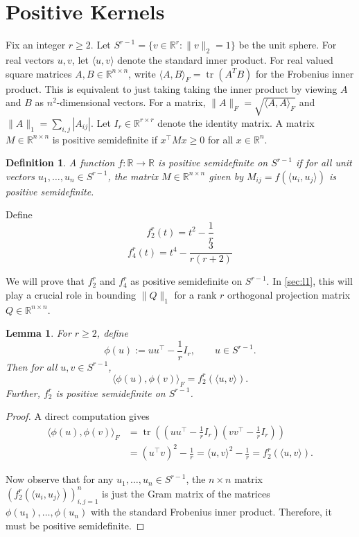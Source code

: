 \documentclass[12pt]{amsart}
\newtheorem{lemma}[lemma]{Lemma}
\theoremstyle{myremark}
\newtheorem{definition}[definition]{Definition}
\DeclareMathOperator{\tr}{tr}
\newcommand{\R}{\mathbb{R}}
\newcommand{\1}{\mathbf{1}}
\newcommand{\inner}[2]{\langle #1,#2\rangle}
\newcommand{\froinner}[2]{\langle #1,#2\rangle_{\!F}}
\begin{document}
\section{Positive Kernels}

Fix an integer $r\ge 2$. Let $S^{r-1} = \{v \in \R^r: \|v\|_2 = 1\}$ be the unit sphere. For real vectors $u,v$, let $\inner{u}{v}$ denote the standard inner product. For real valued square matrices $A,B \in \R^{n\times n}$, write $\inner{A}{B}_F = \tr(A^T B)$ for the Frobenius inner product. This is equivalent to just taking taking the inner product by viewing $A$ and $B$ as $n^2$-dimensional vectors. For a matrix, $\|A\|_F = \sqrt{\froinner{A}{A}}$ and $\|A\|_1 = \sum_{i,j} |A_{ij}|$. Let $I_r \in \R^{r\times r}$ denote the identity matrix. A matrix $M \in \R^{n\times n}$ is positive semidefinite if $x^\top M x \geq 0$ for all $x \in \R^n$.

\begin{definition}
A function $f: \R \rightarrow \R$ is positive semidefinite on $S^{r-1}$ if for all unit vectors $u_1,\ldots,u_n \in S^{r-1}$, the matrix $M \in \R^{n\times n}$ given by $M_{ij} = f(\inner{u_i}{u_j})$ is positive semidefinite.
\end{definition}


Define 
\[f^r_2(t) = t^2 - \frac{1}{r}\]
\[f^r_4(t) = t^4 - \frac{3}{r(r+2)}\]

We will prove that $f_2^r$ and $f_4^r$ as positive semidefinite on $S^{r-1}$. In \cref{sec:l1}, this will play a crucial role in bounding $\|Q\|_1$ for a rank $r$ orthogonal projection matrix $Q \in \R^{n\times n}$.

\begin{lemma}\label{lem:psd2}
For $r \geq 2$, define
\[
\phi(u):=uu^\top-\frac1r I_r,
\qquad u\in S^{r-1}.
\]
Then for all $u,v\in S^{r-1}$,
\[
\froinner{\phi(u)}{\phi(v)}=f_2^r(\inner{u}{v}).
\]
Further, $f_2^r$ is positive semidefinite on $S^{r-1}$.
\end{lemma}

\begin{proof}
A direct computation gives
\begin{align*}
\froinner{\phi(u)}{\phi(v)}
&=\tr\!\left(\left(uu^\top-\frac1r I_r\right)\left(vv^\top-\frac1r I_r\right)\right) \\
&=(u^\top v)^2-\frac1r
 =\inner{u}{v}^2-\frac1r
 =f_2^r(\inner{u}{v}).
\end{align*}

Now observe that for any $u_1,\ldots,u_n \in S^{r-1}$, the $n \times n$ matrix $(f_2^r(\inner{u_i}{u_j}))_{i,j=1}^n$ is just the Gram matrix of the matrices $\phi(u_1),\ldots,\phi(u_n)$ with the standard Frobenius inner product. Therefore, it must be positive semidefinite. 
\end{proof}
\end{document}
